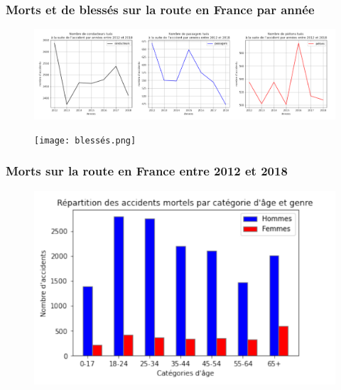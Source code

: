\documentclass{beamer}
\theoremstyle{definition}
\begin{document}
\begin{frame}
\begin{minipage}[t]{1\linewidth}
\begin{minipage}[t]{0.48\linewidth}
\begin{figure}
		\end{figure}\end{minipage}
		
	\end{minipage}	
	
\end{frame}

\begin{frame}
	\frametitle{Morts et de blessés sur la route en France par année}
	\centering
	\begin{minipage}[c]{1\linewidth}\centering\begin{figure}
			
			\includegraphics[width=1\linewidth]{morts.png}
		\end{figure}
	\end{minipage}
	
	\begin{minipage}[t]{1\linewidth}\centering\begin{figure}
			\begin{center}
				\texttt{[image: blessés.png]}			
			\end{center}
			
	\end{figure}\end{minipage}	
\end{frame}

\begin{frame}
	\frametitle{Morts sur la route en France entre 2012 et 2018}
	\centering
	\begin{minipage}[c]{1\linewidth}\centering\begin{figure}
			
			\includegraphics[width=1\linewidth]{morts_genre.png}
		\end{figure}
	\end{minipage}
	
\end{frame}
\end{document}
